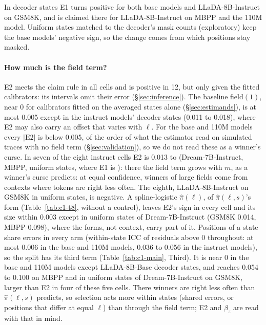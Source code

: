 In decoder states E1 turns positive for both base models and LLaDA-8B-Instruct on GSM8K, and is
claimed there for LLaDA-8B-Instruct on MBPP and the 110M model. Uniform states matched to the
decoder's mask counts (exploratory) keep the base models' negative sign, so the change comes
from which positions stay masked.

\paragraph{How much is the field term?}
E2 meets the claim rule in all  cells and is positive in 12, but only given the fitted calibrators: its intervals omit
their error (\S\ref{sec:inference}). The baseline field$(1)$,
near 0 for calibrators fitted on the averaged states alone (\S\ref{sec:estimands}), is at most
0.005 except in the instruct models' decoder states (0.011 to 0.018), where E2 may also carry an
offset that varies with $\ell$. For the base and 110M
models every $|\mathrm{E2}|$ is below 0.005, of the order of what the estimator read on
simulated traces with no field term (\S\ref{sec:validation}), so we do not read these as a
winner's curse. In seven
of the eight instruct cells E2 is 0.013 to 
(Dream-7B-Instruct, MBPP, uniform states, where E1 is ):
there the field term grows with $m$, as a winner's curse predicts: at equal confidence,
winners of large fields come from contexts where tokens are right less often. The eighth,
LLaDA-8B-Instruct on GSM8K in uniform states, is negative.
A spline-logistic $\hat\pi(\ell)$, of $\hat\pi(\ell,s)$'s form (Table~\ref{tab:c1-t8}, without a
control), leaves E2's sign in every cell and its size within 0.003 except in uniform states of
Dream-7B-Instruct (GSM8K 0.014, MBPP 0.098), where the forms, not context, carry part of it.
Positions of a state share errors in every arm (within-state ICC of residuals above 0
throughout: at most 0.006 in the base and 110M models, 0.036 to 0.056 in the instruct models),
so the split has its third term (Table~\ref{tab:c1-main}, Third). It is near 0 in the base and 110M
models except LLaDA-8B-Base decoder states, and reaches 0.054 to 0.100 on MBPP and in
uniform states of Dream-7B-Instruct on GSM8K, larger than E2 in four of these five cells. There
winners are right less often than $\hat\pi(\ell,s)$ predicts, so selection acts more within states
(shared errors, or positions that differ at equal $\ell$) than through the field term;
E2 and $\beta_z$ are read with that in mind.

